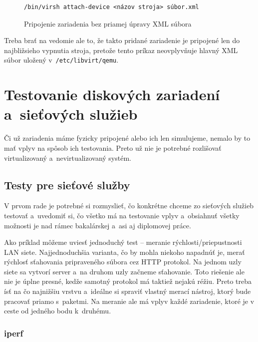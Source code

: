 \begin{figure}[H]
\begin{lstlisting}[label=alg:virsh-attach-device]
/bin/virsh attach-device <názov stroja> súbor.xml
\end{lstlisting}
\caption{Pripojenie zariadenia bez priamej úpravy XML súbora}
\end{figure}

Treba brať na vedomie ale to, že takto pridané zariadenie je pripojené len do
najbližsieho vypnutia stroja, pretože tento príkaz neovplyvňuje hlavný XML
súbor uložený v~\texttt{/etc/libvirt/qemu}.

%
%

\chapter{Testovanie diskových zariadení a~sieťových služieb}

Či už zariadenia máme fyzicky pripojené alebo ich len simulujeme, nemalo by to
mať vplyv na spôsob ich testovania. Preto už nie je potrebné rozlišovať
virtualizovaný a~nevirtualizovaný systém.

%
%

\section{Testy pre sieťové služby}

V prvom rade je potrebné si rozmyslieť, čo konkrétne chceme zo sieťových
služieb testovať a~uvedomiť si, čo všetko má na testovanie vplyv a~obsiahnuť
všetky možnosti je nad rámec bakalárskej a~asi aj diplomovej práce.

Ako príklad môžeme uviesť jednoduchý test -- meranie rýchlosti/priepustnosti
LAN siete.  Najjednoduchšia varianta, čo by mohla niekoho napadnúť je, merať
rýchlosť sťahovania pripraveného súbora cez HTTP protokol. Na jednom uzly siete
sa vytvorí server a~na druhom uzly začneme sťahovanie. Toto riešenie ale nie je
úplne presné, kedže samotný protokol má taktiež nejakú réžiu. Preto treba ísť
na čo najnižšiu vrstvu a~ideálne si spraviť vlastný merací nástroj, ktorý bude
pracovať priamo s~paketmi. Na meranie ale má vplyv každé zariadenie, ktoré je
v ceste od jedného bodu k~druhému.

%
%

\subsection*{iperf}

